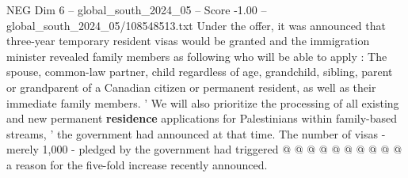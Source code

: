 \begin{textsample}{NEG Dim 6 – global\_south\_2024\_05 – Score -1.00 – global\_south\_2024\_05/108548513.txt}
Under the offer, it was announced that three-year temporary resident visas would be granted and the immigration minister revealed family members as following who will be able to apply : The spouse, common-law partner, child regardless of age, grandchild, sibling, parent or grandparent of a Canadian citizen or permanent resident, as well as their immediate family members. ' We will also prioritize the processing of all existing and new permanent \textbf{residence} applications for Palestinians within family-based streams, ' the government had announced at that time.
The number of visas - merely 1,000 - pledged by the government had triggered @ @ @ @ @ @ @ @ @ @ a reason for the five-fold increase recently announced.

\end{textsample}
